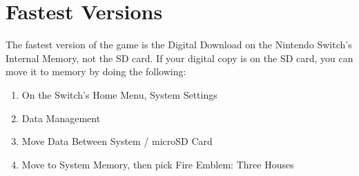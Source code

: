 \section*{Fastest Versions}
The fastest version of the game is the Digital Download on the Nintendo Switch's Internal Memory, not the SD card. If your digital copy is on the SD card, you can move it to memory by doing the following:
 
 \begin{enumerate}
\item On the Switch's Home Menu, System Settings
\item Data Management
\item Move Data Between System / microSD Card
\item Move to System Memory, then pick Fire Emblem: Three Houses
\end{enumerate}